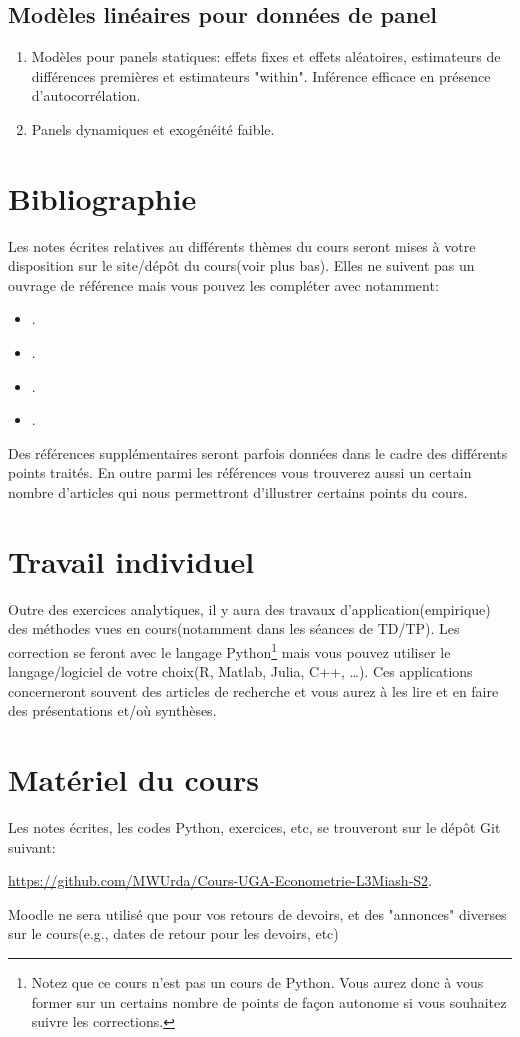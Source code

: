 \documentclass[10pt, reqno]{amsart}
\begin{document}
\subsection{Modèles linéaires pour données de panel}
\begin{enumerate}[resume]
\item Modèles pour panels statiques: effets fixes et effets aléatoires, estimateurs de différences premières 
et estimateurs "within". Inférence efficace en présence d'autocorrélation.
\item Panels dynamiques et exogénéité faible.
\end{enumerate}


\section{Bibliographie}

Les notes écrites relatives au différents thèmes du cours seront mises à votre disposition sur le site/dépôt du cours(voir plus bas).
Elles ne suivent pas un ouvrage de référence mais vous pouvez les compléter avec  notamment:
\begin{itemize}[label = -]
\item \cite{Amemiya1985}.
\item \cite{ap2009}.
\item \cite{Hansen2017}.
\item \cite{Wooldridge2010}.
\end{itemize}
Des références supplémentaires seront parfois données dans le cadre des différents points traités.
En outre parmi les références vous trouverez aussi un certain nombre d'articles qui nous 
permettront d'illustrer certains points du cours. 


\section{Travail individuel}
Outre des exercices analytiques, il y aura des travaux d'application(empirique) des méthodes 
vues en cours(notamment dans les séances de TD/TP). Les correction se feront avec le langage 
Python\footnote{Notez que ce cours n'est pas un cours de Python. Vous aurez donc à vous former sur un certains nombre de points 
de façon autonome si vous souhaitez suivre les corrections.} mais vous pouvez utiliser 
le langage/logiciel de votre choix(R, Matlab, Julia, C++, \ldots). Ces applications concerneront souvent 
des articles de recherche et vous aurez à les lire et en faire des présentations et/où synthèses.

\section{Matériel du cours}

Les notes écrites, les codes Python, exercices, etc, se trouveront sur le dépôt Git suivant:

\url{https://github.com/MWUrda/Cours-UGA-Econometrie-L3Miash-S2}.

Moodle ne sera utilisé que pour vos retours de devoirs, et des "annonces" diverses sur le cours(e.g., dates de retour pour les devoirs, etc)


 
\end{document}
